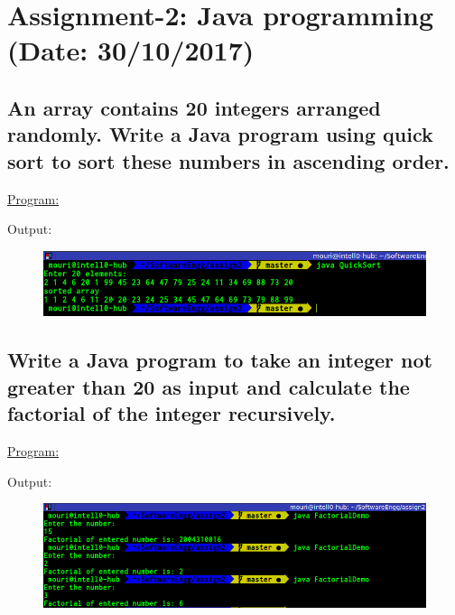 \documentclass[a4paper,11pt]{article}
\begin{document}
\newpage
\section{Assignment-2: Java programming (Date: 30/10/2017)}
\subsection{An array contains 20 integers arranged randomly. Write a Java program using quick sort to sort these numbers in ascending order.}
\underline{Program:}

Output:
\begin{figure}[H]
\centering
\includegraphics[width=350pt,height=\textheight,keepaspectratio]{./pics/Java/1.png}
\end{figure}

\bigskip

\subsection{Write a Java program to take an integer not greater than 20 as input and calculate the factorial of the integer recursively.}
\underline{Program:}

Output:
\begin{figure}[H]
\centering
\includegraphics[width=350pt,height=\textheight,keepaspectratio]{./pics/Java/2.png}
\end{figure}

\bigskip
\end{document}
